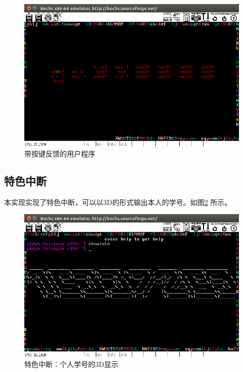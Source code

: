 \documentclass[a4paper]{article}
\begin{document}
\begin{figure}[H]
    \begin{center}
    \includegraphics[scale=0.5]{assets/user.png}
    \caption{带按键反馈的用户程序\label{fig:user}} 
    \end{center} 
\end{figure} 

\subsection{特色中断}
本实现实现了特色中断，可以以3D的形式输出本人的学号。如图\ref{fig:3_D_id}
所示。

\begin{figure}[H]
    \begin{center}
    \includegraphics[scale=0.5]{assets/16337269.png}
    \caption{特色中断：个人学号的3D显示\label{fig:3_D_id}} 
    \end{center} 
\end{figure} 
\end{document}
